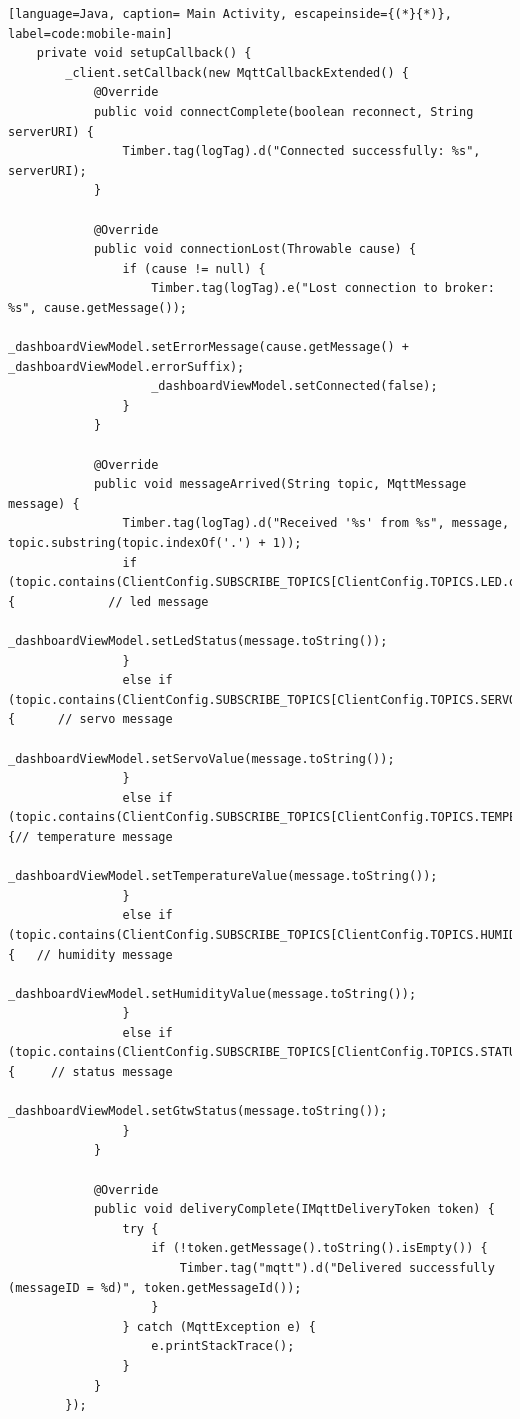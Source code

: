 \begin{lstlisting}[language=Java, caption= Main Activity, escapeinside={(*}{*)}, label=code:mobile-main]
    private void setupCallback() {
        _client.setCallback(new MqttCallbackExtended() {
            @Override
            public void connectComplete(boolean reconnect, String serverURI) {
                Timber.tag(logTag).d("Connected successfully: %s", serverURI);
            }

            @Override
            public void connectionLost(Throwable cause) {
                if (cause != null) {
                    Timber.tag(logTag).e("Lost connection to broker: %s", cause.getMessage());
                    _dashboardViewModel.setErrorMessage(cause.getMessage() + _dashboardViewModel.errorSuffix);
                    _dashboardViewModel.setConnected(false);
                }
            }

            @Override
            public void messageArrived(String topic, MqttMessage message) {
                Timber.tag(logTag).d("Received '%s' from %s", message, topic.substring(topic.indexOf('.') + 1));
                if (topic.contains(ClientConfig.SUBSCRIBE_TOPICS[ClientConfig.TOPICS.LED.ordinal()])) {             // led message
                    _dashboardViewModel.setLedStatus(message.toString());
                }
                else if (topic.contains(ClientConfig.SUBSCRIBE_TOPICS[ClientConfig.TOPICS.SERVO.ordinal()])) {      // servo message
                    _dashboardViewModel.setServoValue(message.toString());
                }
                else if (topic.contains(ClientConfig.SUBSCRIBE_TOPICS[ClientConfig.TOPICS.TEMPERATURE.ordinal()])) {// temperature message
                    _dashboardViewModel.setTemperatureValue(message.toString());
                }
                else if (topic.contains(ClientConfig.SUBSCRIBE_TOPICS[ClientConfig.TOPICS.HUMIDITY.ordinal()])) {   // humidity message
                    _dashboardViewModel.setHumidityValue(message.toString());
                }
                else if (topic.contains(ClientConfig.SUBSCRIBE_TOPICS[ClientConfig.TOPICS.STATUS.ordinal()])) {     // status message
                    _dashboardViewModel.setGtwStatus(message.toString());
                }
            }

            @Override
            public void deliveryComplete(IMqttDeliveryToken token) {
                try {
                    if (!token.getMessage().toString().isEmpty()) {
                        Timber.tag("mqtt").d("Delivered successfully (messageID = %d)", token.getMessageId());
                    }
                } catch (MqttException e) {
                    e.printStackTrace();
                }
            }
        });


\end{lstlisting}
